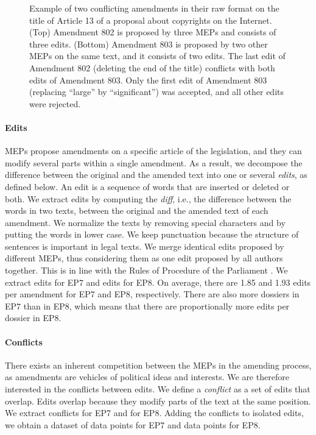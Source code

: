 \begin{figure}
  \centering
	\newcommand{\imgscale}{\linewidth*3/4}
	{%
		\setlength{\fboxsep}{5.5pt}%
		\setlength{\fboxrule}{0.5pt}%
	}%
	\vfill
	\vspace{4pt}
	{%
		\setlength{\fboxsep}{5.5pt}%
		\setlength{\fboxrule}{0.5pt}%
	}%
	\caption{
		Example of two conflicting amendments in their raw format on the title of Article 13 of a proposal about copyrights on the Internet.
		(Top) Amendment 802 is proposed by three MEPs and consists of three edits.
		(Bottom) Amendment 803 is proposed by two other MEPs on the same text, and it consists of two edits.
		The last edit of Amendment 802 (deleting the end of the title) conflicts with both edits of Amendment 803.
		Only the first edit of Amendment 803 (replacing ``large'' by ``significant'') was accepted, and all other edits were rejected.
	}
	\label{lmp:fig:amendment}
\end{figure}

\paragraph{Edits}
MEPs propose amendments on a specific article of the legislation, and they can modify several parts within a single amendment.
As a result, we decompose the difference between the original and the amended text into one or several \emph{edits}, as defined below.
An edit is a sequence of words that are inserted or deleted or both.
We extract edits by computing the \emph{diff}, i.e., the difference between the words in two texts, between the original and the amended text of each amendment.
We normalize the texts by removing special characters and by putting the words in lower case.
We keep punctuation because the structure of sentences is important in legal texts.
We merge identical edits proposed by different MEPs, thus considering them as one edit proposed by all authors together.
This is in line with the Rules of Procedure of the Parliament \cite{europarl2018rules}.
We extract  edits for EP7 and  edits for EP8.
On average, there are 1.85 and 1.93 edits per amendment for EP7 and EP8, respectively.
There are also more dossiers in EP7 than in EP8, which means that there are proportionally more edits per dossier in EP8.

\paragraph{Conflicts}
There exists an inherent competition between the MEPs in the amending process, as amendments are vehicles of political ideas and interests.
We are therefore interested in the conflicts between edits.
We define a \emph{conflict} as a set of edits that overlap.
Edits overlap because they modify parts of the text at the same position.
We extract  conflicts for EP7 and  for EP8.
Adding the conflicts to isolated edits, we obtain a dataset of  data points for EP7 and  data points for EP8.

